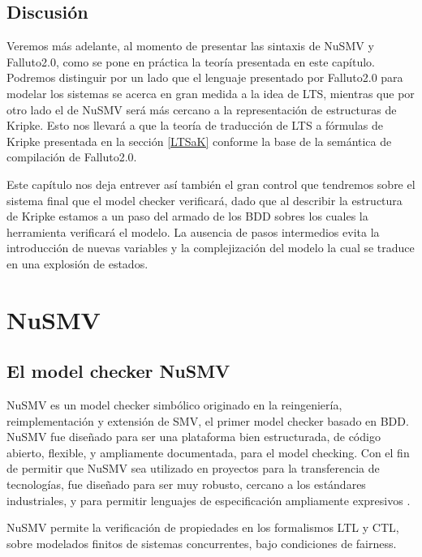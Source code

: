 \documentclass[titlepage, 12pt]{book}
\begin{document}
\section{Discusi\'on}
Veremos m\'as adelante, al momento de presentar las sintaxis de NuSMV y Falluto2.0, como se pone en pr\'actica la teor\'ia presentada en este cap\'itulo. Podremos distinguir por un lado que el lenguaje presentado por Falluto2.0 para modelar los sistemas se acerca en gran medida a la idea de LTS, mientras que por otro lado el de NuSMV ser\'a m\'as cercano a la representaci\'on de estructuras de Kripke. Esto nos llevar\'a a que la teor\'ia de traducci\'on de LTS a f\'ormulas de Kripke presentada en la secci\'on \ref{LTSaK} conforme la base de la sem\'antica de compilaci\'on de Falluto2.0.
 
Este cap\'itulo nos deja entrever as\'i tambi\'en el gran control que tendremos sobre el sistema final que el model checker verificar\'a, dado que al describir la estructura de Kripke estamos a un paso del armado de los BDD sobres los cuales la herramienta verificar\'a el modelo. La ausencia de pasos intermedios evita la introducci\'on de nuevas variables y la complejizaci\'on del modelo la cual se traduce en una explosi\'on de estados.







\chapter{NuSMV}
\section{El model checker NuSMV}

NuSMV es un model checker simb\'olico originado en la reingenier\'ia, reimplementaci\'on y extensi\'on de SMV, el primer model checker basado en BDD. NuSMV fue dise\~nado para ser una plataforma bien estructurada, de c\'odigo abierto, flexible, y ampliamente documentada, para el model checking. Con el fin de permitir que NuSMV sea utilizado en proyectos para la transferencia de tecnolog\'ias, fue dise\~nado para ser muy robusto, cercano a los est\'andares industriales, y para permitir lenguajes de especificaci\'on ampliamente expresivos \cite{Cimatti}.

NuSMV permite la verificaci\'on de propiedades en los formalismos LTL y CTL, sobre modelados finitos de sistemas concurrentes, bajo condiciones de fairness.
\end{document}
